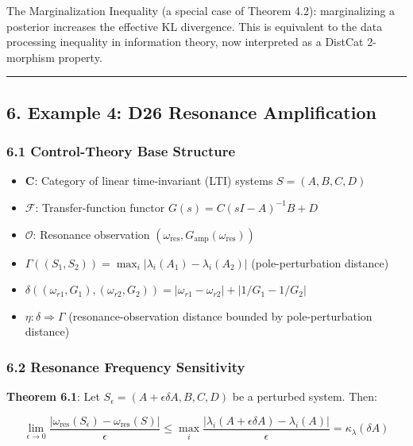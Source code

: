 \documentclass[
]{article}
\providecommand{\tightlist}{%
  \setlength{\itemsep}{0pt}\setlength{\parskip}{0pt}}
\begin{document}
The Marginalization Inequality (a special case of Theorem 4.2):
marginalizing a posterior increases the effective KL divergence. This is
equivalent to the data processing inequality in information theory, now
interpreted as a DistCat 2-morphism property.

\begin{center}\rule{0.5\linewidth}{0.5pt}\end{center}

\subsection{6. Example 4: D26 Resonance
Amplification}\label{example-4-d26-resonance-amplification}

\subsubsection{6.1 Control-Theory Base
Structure}\label{control-theory-base-structure}

\begin{itemize}
\tightlist
\item
  \(\mathbf{C}\): Category of linear time-invariant (LTI) systems
  \(S = (A, B, C, D)\)
\item
  \(\mathcal{F}\): Transfer-function functor
  \(G(s) = C(sI - A)^{-1}B + D\)
\item
  \(\mathcal{O}\): Resonance observation
  \((\omega_{\text{res}}, G_{\text{amp}}(\omega_{\text{res}}))\)
\item
  \(\Gamma((S_1, S_2)) = \max_i |\lambda_i(A_1) - \lambda_i(A_2)|\)
  (pole-perturbation distance)
\item
  \(\delta((\omega_{r1}, G_1), (\omega_{r2}, G_2)) = |\omega_{r1} - \omega_{r2}| + |1/G_1 - 1/G_2|\)
\item
  \(\eta: \delta \Rightarrow \Gamma\) (resonance-observation distance
  bounded by pole-perturbation distance)
\end{itemize}

\subsubsection{6.2 Resonance Frequency
Sensitivity}\label{resonance-frequency-sensitivity}

\textbf{Theorem 6.1}: Let
\(S_\epsilon = (A + \epsilon \delta A, B, C, D)\) be a perturbed system.
Then:

\[\lim_{\epsilon \to 0} \frac{|\omega_{\text{res}}(S_\epsilon) - \omega_{\text{res}}(S)|}{\epsilon} \leq \max_i \frac{|\lambda_i(A + \epsilon \delta A) - \lambda_i(A)|}{\epsilon} = \kappa_\lambda(\delta A)\]
\end{document}
